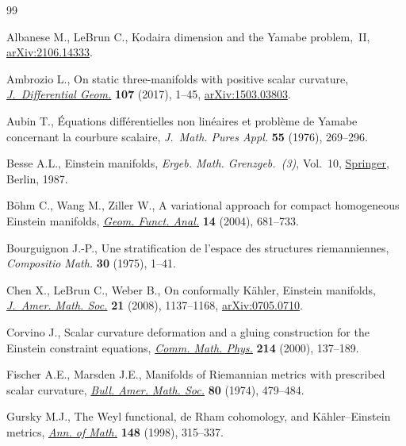 \documentclass[pdftex]{sigma}
\numberwithin{equation}{section}
\begin{document}
\begin{thebibliography}{99}
\footnotesize\itemsep=0pt

Albanese M., LeBrun C., Kodaira dimension and the {Y}amabe problem,~{II},
 \href{https://arxiv.org/abs/2106.14333}{arXiv:2106.14333}.

Ambrozio L., On static three-manifolds with positive scalar curvature,
 \href{https://doi.org/10.4310/jdg/1505268028}{\textit{J.~Differential Geom.}} \textbf{107} (2017), 1--45,
 \href{https://arxiv.org/abs/1503.03803}{arXiv:1503.03803}.

Aubin T., \'Equations diff\'erentielles non lin\'eaires et probl\`eme de
 {Y}amabe concernant la courbure scalaire, \textit{J.~Math. Pures Appl.}
 \textbf{55} (1976), 269--296.

Besse A.L., Einstein manifolds, \textit{Ergeb. Math. Grenzgeb.~(3)}, Vol.~10,
 \href{https://doi.org/10.1007/978-3-540-74311-8}{Springer}, Berlin, 1987.

B\"ohm C., Wang M., Ziller W., A variational approach for compact homogeneous
 {E}instein manifolds, \href{https://doi.org/10.1007/s00039-004-0471-x}{\textit{Geom. Funct. Anal.}} \textbf{14} (2004),
 681--733.

Bourguignon J.-P., Une stratification de l'espace des structures riemanniennes,
 \textit{Compositio Math.} \textbf{30} (1975), 1--41.

Chen X., LeBrun C., Weber B., On conformally {K}\"ahler, {E}instein manifolds,
 \href{https://doi.org/10.1090/S0894-0347-08-00594-8}{\textit{J.~Amer. Math. Soc.}} \textbf{21} (2008), 1137--1168,
 \href{https://arxiv.org/abs/0705.0710}{arXiv:0705.0710}.

Corvino J., Scalar curvature deformation and a gluing construction for the
 {E}instein constraint equations, \href{https://doi.org/10.1007/PL00005533}{\textit{Comm. Math. Phys.}} \textbf{214}
 (2000), 137--189.

Fischer A.E., Marsden J.E., Manifolds of {R}iemannian metrics with prescribed
 scalar curvature, \href{https://doi.org/10.1090/S0002-9904-1974-13457-9}{\textit{Bull. Amer. Math. Soc.}} \textbf{80} (1974),
 479--484.

Gursky M.J., The {W}eyl functional, de {R}ham cohomology, and
 {K}\"ahler--{E}instein metrics, \href{https://doi.org/10.2307/120996}{\textit{Ann. of Math.}} \textbf{148} (1998),
 315--337.


\end{thebibliography}
\end{document}
